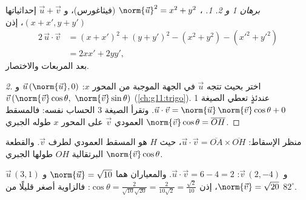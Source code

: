 \begin{proof}[برهان 1 و 2]
\emph{1.} ، $\norm{\vec u}^2 = x^2 + y^2$ (فيثاغورس)، و
$\vec u + \vec v$ إحداثياتها $(x + x', y + y')$، إذن
\begin{align*}
2\,\vec u \cdot \vec v
&= (x + x')^2 + (y + y')^2 - (x^2 + y^2) - (x'^2 + y'^2)\\
&= 2xx' + 2yy',
\end{align*}
بعد  المربعات والاختصار.

\emph{2.} اختر  بحيث تتجه $\vec u$ في الجهة
الموجبة من المحور $x$: $\vec u\,(\norm{\vec u}, 0)$ و
$\vec v\,(\norm{\vec v}\cos\theta,\ \norm{\vec v}\sin\theta)$
(\cref{ch:g11:trigo}). عندئذٍ تعطي الصيغة 1
$\vec u \cdot \vec v = \norm{\vec u}\,\norm{\vec v}\cos\theta + 0$.
وتقرأ الصيغة 3 الحساب نفسه: فالمسقط العمودي  $\vec v$ على
المحور $x$ طوله الجبري $\norm{\vec v}\cos\theta =
\overline{OH}$.
\end{proof}

\begin{omfigure}

{\small منظر الإسقاط: $\vec u \cdot \vec v = \overline{OA} \times
\overline{OH}$، حيث $H$ هو المسقط العمودي لطرف
 $\vec v$. والقطعة البرتقالية $OH$ طولها الجبري
$\norm{\vec v}\cos\theta$.}
\end{omfigure}

\begin{example}\label{ex:g11:scal:compute}
$\vec u\,(3, 1)$ و $\vec v\,(2, -4)$:
$\vec u \cdot \vec v = 6 - 4 = 2$. والمعياران هما
$\norm{\vec u} = \sqrt{10}$ و $\norm{\vec v} = \sqrt{20}$، إذن
$\cos\theta = \frac{2}{\sqrt{10}\sqrt{20}} = \frac{2}{10\sqrt2}
= \frac{\sqrt2}{10}$: فالزاوية أصغر قليلًا من $82^\circ$.
\end{example}

